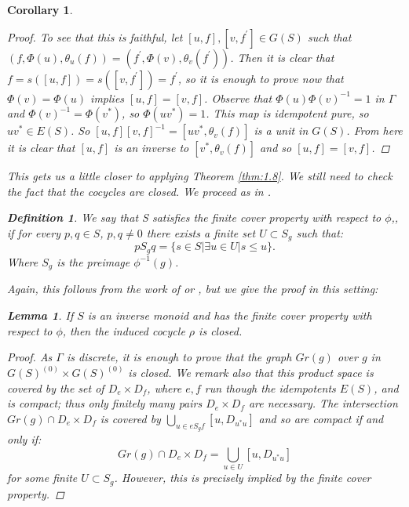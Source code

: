 \documentclass[11pt]{amsart}
\theoremstyle{plain}
\newtheorem{lemma}[theorem]{Lemma}%
\newtheorem{corollary}[theorem]{Corollary}%
\theoremstyle{definition}%
\newtheorem{definition}[theorem]{Definition}%
\theoremstyle{remark}%
\begin{document}
\begin{corollary}
\begin{proof}
To see that this is faithful, let $[u,f], [v,f^{'}] \in G(S)$ such that $(f,\Phi(u),\theta_{u}(f))=(f^{'},\Phi(v),\theta_{v}(f^{'}))$. Then it is clear that $f=s([u,f])=s([v,f^{'}])=f^{'}$, so it is enough to prove now that $\Phi(v)=\Phi(u)$ implies $[u,f]=[v,f]$. Observe that $\Phi(u)\Phi(v)^{-1}=1$ in $\Gamma$ and $\Phi(v)^{-1}=\Phi(v^{*})$, so $\Phi(uv^{*})=1$. This map is idempotent pure, so $uv^{*} \in E(S)$. So $[u,f][v,f]^{-1}=[uv^{*},\theta_{v}(f)]$ is a unit in $G(S)$. From here it is clear that $[u,f]$ is an inverse to $[v^{*},\theta_{v}(f)]$ and so $[u,f]=[v,f]$.\end{proof}

This gets us a little closer to applying Theorem \ref{thm:1.8}. We still need to check the fact that the cocycles are closed. We proceed as in \cite{MR1900993}.

\begin{definition}
We say that S satisfies the finite cover property with respect to $\phi$,, if for every $p,q \in S$, $p,q\not = 0$ there exists a finite set $U \subset S_{g}$ such that:
\begin{equation*}
pS_{g}q=\lbrace s \in S | \exists u \in U | s \leq u \rbrace.
\end{equation*}
Where $S_{g}$ is the preimage $\phi^{-1}(g)$.
\end{definition}

Again, this follows from the work of \cite{Milan-Steinberg} or \cite{MR1900993}, but we give the proof in this setting:

\begin{lemma}
If $S$ is an inverse monoid and has the finite cover property with respect to $\phi$, then the induced cocycle $\rho$ is closed.
\end{lemma}
\begin{proof}
As $\Gamma$ is discrete, it is enough to prove that the graph $Gr(g)$ over $g$ in $G(S)^{(0)}\times G(S)^{(0)}$ is closed. We remark also that this product space is covered by the set of $D_{e} \times D_{f}$, where $e,f$ run though the idempotents $E(S)$, and is compact; thus only finitely many pairs $D_{e}\times D_{f}$ are necessary. The intersection $Gr(g) \cap D_{e}\times D_{f}$ is covered by $\bigcup_{u \in eS_{g}f} [u,D_{u^{*}u}]$ and so are compact if and only if:
\begin{equation*}
Gr(g) \cap D_{e}\times D_{f} = \bigcup_{u \in U}[u,D_{u^{*}u}]
\end{equation*}
for some finite $U \subset S_{g}$. However, this is precisely implied by the finite cover property.
\end{proof}


\end{corollary}
\end{document}
